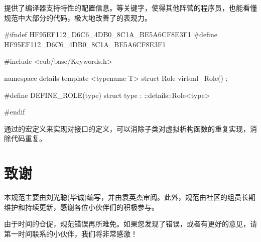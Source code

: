 \begin{content}
提供了编译器支持特性的配置信息。等关键字，使得其他阵营的程序员，也能看懂规范中大部分的代码，极大地改善了的表现力。

\begin{leftbar}
\begin{c++}[caption={\ttfamily{cub/base/Role.h}}]
#ifndef HF95EF112_D6C6_4DB0_8C1A_BE5A6CF8E3F1
#define HF95EF112_D6C6_4DB0_8C1A_BE5A6CF8E3F1

#include <cub/base/Keywords.h>

namespace details
{
   template <typename T>
   struct Role
   {
      virtual ~Role() {}
   };
}

#define DEFINE_ROLE(type) struct type : ::details::Role<type>

#endif
\end{c++}
\end{leftbar}

通过的宏定义来实现对接口的定义，可以消除子类对虚拟析构函数的重复实现，消除代码重复。

\end{content}

\section*{致谢}

\begin{content}

本规范主要由刘光聪(毕诚)编写，并由袁英杰审阅。此外，规范由社区的组员长期维护和持续更新，感谢各位小伙伴们的积极参与。

由于时间的仓促，规范错误再所难免。如果您发现了错误，或者有更好的意见，请第一时间联系的小伙伴，我们将非常感激！

\end{content}